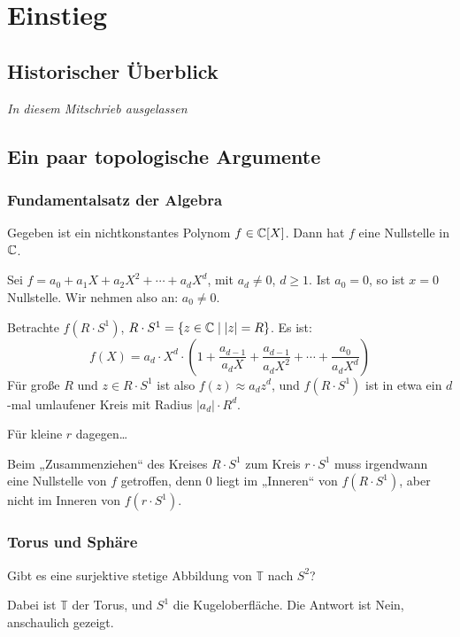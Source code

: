 \documentclass[a4paper,twoside,DIV15,BCOR12mm]{scrbook}
\begin{document}
\chapter{Einstieg}

\section{Historischer Überblick}

\emph{In diesem Mitschrieb ausgelassen}

\section{Ein paar topologische Argumente}

\subsection{Fundamentalsatz der Algebra}
\begin{satz}
Gegeben ist ein nichtkonstantes Polynom $f\in \mathbb{C}[X]$. Dann hat $f$ eine Nullstelle in $\mathbb{C}$.
\end{satz}

\begin{beweis}[Skizze] Sei $f=a_0 + a_1X + a_2X^2 + \cdots + a_dX^d$, mit $a_d \ne 0$, $d \ge 1$. Ist $a_0 = 0$, so ist $x=0$ Nullstelle. Wir nehmen also an: $a_0 \ne 0$.

Betrachte $f(R\cdot S^1)$, $R\cdot S^1 = \{ z \in \mathbb{C} \mid |z|=R\}$. Es ist:
\[
f(X) = a_d \cdot X^d \cdot (1+\frac{a_{d-1}}{a_dX} + \frac{a_{d-1}}{a_dX^2} + \cdots + \frac{a_0}{a_dX^d})
\]
Für große $R$ und $z\in R\cdot S^1$ ist also $f(z) \approx a_dz^d$, und $f(R\cdot S^1)$ ist in etwa ein $d$-mal umlaufener Kreis mit Radius $|a_d|\cdot R^d$.

Für kleine $r$ dagegen\dots

Beim „Zusammenziehen“ des Kreises $R\cdot S^1$ zum Kreis $r\cdot S^1$ muss irgendwann eine Nullstelle von $f$ getroffen, denn $0$ liegt im „Inneren“ von $f(R\cdot S^1)$, aber nicht im Inneren von $f(r\cdot S^1)$.
\end{beweis}

\subsection{Torus und Sphäre}
Gibt es eine surjektive stetige Abbildung von $\mathbb T$ nach $S^2$?

Dabei ist $\mathbb T$ der Torus, und $S^1$ die Kugeloberfläche. Die Antwort ist Nein, anschaulich gezeigt.
\end{document}
